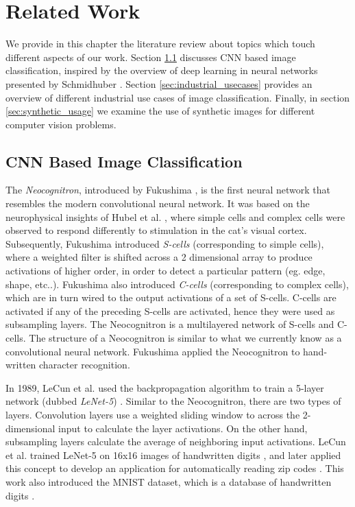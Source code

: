 \chapter{Related Work}\label{ch:related_work}

We provide in this chapter the literature review about topics which touch different aspects of our work. Section \ref{sec:cnn_based_image_classification} discusses CNN based image classification, inspired by the overview of deep learning in neural networks presented by Schmidhuber \cite{schmidhuber2015deep}. Section \ref{sec:industrial_usecases} provides an overview of different industrial use cases of image classification. Finally, in section \ref{sec:synthetic_usage} we examine the use of synthetic images for different computer vision problems.


\section{CNN Based Image Classification}\label{sec:cnn_based_image_classification}

The \textit{Neocognitron}, introduced by Fukushima \cite{fukushima1980neocognitron}, is the first neural network that resembles the modern convolutional neural network. It was based on the neurophysical insights of Hubel et al. \cite{hubel1959receptive} \cite{hubel1962receptive}, where simple cells and complex cells were observed to respond differently to stimulation in the cat’s visual cortex. Subsequently, Fukushima introduced \textit{S-cells} (corresponding to simple cells), where a weighted filter is shifted across a 2 dimensional array to produce activations of higher order, in order to detect a particular pattern (eg. edge, shape, etc..). Fukushima also introduced \textit{C-cells} (corresponding to complex cells), which are in turn wired to the output activations of a set of S-cells. C-cells are activated if any of the preceding S-cells are activated, hence they were used as subsampling layers. The Neocognitron is a multilayered network of S-cells and C-cells. The structure of a Neocognitron is similar to what we currently know as a convolutional neural network. Fukushima applied the Neocognitron to hand-written character recognition.

In 1989, LeCun et al. used the backpropagation algorithm to train a 5-layer network (dubbed \textit{LeNet-5}) \cite{lecun1989generalization} \cite{lecun1998gradient}. Similar to the Neocognitron, there are two types of layers. Convolution layers use a weighted sliding window to across the 2-dimensional input to calculate the layer activations. On the other hand, subsampling layers calculate the average of neighboring input activations. LeCun et al. trained LeNet-5 on 16x16 images of handwritten digits \cite{lecun1990handwritten}, and later applied this concept to develop an application for automatically reading zip codes \cite{lecun1989backpropagation}. This work also introduced the MNIST dataset, which is a database of handwritten digits \cite{lecun1998mnist}.

